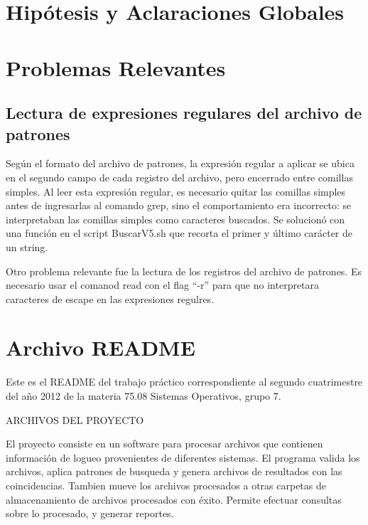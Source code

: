 \documentclass[a4paper,10pt,titlepage]{article}
\begin{document}

\section{Hip\'otesis y Aclaraciones Globales}

\section{Problemas Relevantes}

\subsection{Lectura de expresiones regulares del archivo de patrones}

Según el formato del archivo de patrones, la expresión regular a aplicar se ubica en el segundo campo de cada registro del archivo, pero encerrado entre comillas simples. Al leer esta expresión regular, es necesario quitar las comillas simples antes de ingresarlas al comando grep, sino el comportamiento era incorrecto: se interpretaban las comillas simples como caracteres buscados. Se solucionó con una función en el script BuscarV5.sh que recorta el primer y último carácter de un string.

Otro problema relevante fue la lectura de los registros del archivo de patrones. Es necesario usar el comanod read con el flag “-r” para que no interpretara caracteres de escape en las expresiones regulres.

\section{Archivo README}


Este es el README del trabajo práctico correspondiente al segundo cuatrimestre del año 2012 de la materia 75.08 Sistemas Operativos, grupo 7.
 
ARCHIVOS DEL PROYECTO
 
El proyecto consiste en un software para procesar archivos que contienen información de logueo provenientes de diferentes sistemas. El programa valida los archivos, aplica patrones de busqueda y genera archivos de resultados con las coincidencias. Tambien mueve los archivos procesados a otras carpetas de almacenamiento de archivos procesados con éxito. Permite efectuar consultas sobre lo procesado, y generar reportes.
\end{document}
